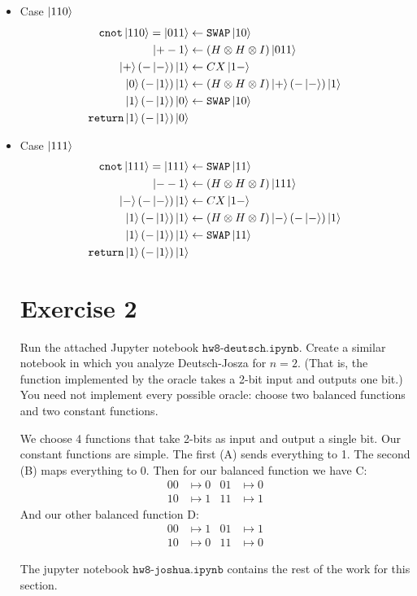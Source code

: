 \documentclass[11pt]{article}
\def\swap{\texttt{SWAP}}
\def\cnot{\texttt{cnot}}
\begin{document}
\begin{itemize}
\item[] Case $\ket{110}$
\begin{align*}
    \cnot\ket{110} = 
    \ket{011} &\leftarrow \swap\ket{10} \\
    \ket{+-1} &\leftarrow (H \otimes H \otimes I)\ket{011} \\
    \ket{+}(-\ket{-})\ket{1} &\leftarrow CX\ket{1-} \\
    \ket{0}(-\ket{1})\ket{1} &\leftarrow (H \otimes H \otimes I)\ket{+}(-\ket{-})\ket{1} \\
    \ket{1}(-\ket{1})\ket{0} &\leftarrow \swap\ket{10} \\
     \texttt{return} \ket{1}(-\ket{1})\ket{0}
\end{align*}


\item[] Case $\ket{111}$
\begin{align*}
    \cnot\ket{111} = 
    \ket{111} &\leftarrow \swap\ket{11} \\
    \ket{--1} &\leftarrow (H \otimes H \otimes I)\ket{111} \\
    \ket{-}(-\ket{-})\ket{1} &\leftarrow CX\ket{1-} \\
    \ket{1}(-\ket{1})\ket{1} &\leftarrow 
        (H \otimes H \otimes I)\ket{-}(-\ket{-})\ket{1} \\
    \ket{1}(-\ket{1})\ket{1} &\leftarrow \swap\ket{11} \\
     \texttt{return} \ket{1}(-\ket{1})\ket{1}
\end{align*}

\section*{Exercise 2}
Run the attached Jupyter notebook $\texttt{hw8-deutsch.ipynb}$. Create 
a similar notebook in which you analyze Deutsch-Josza for $n = 2$. 
(That is, the function implemented by the oracle takes a 2-bit 
input and outputs one bit.) You need not implement every possible oracle: choose two
balanced functions and two constant functions. 

We choose 4 functions that take 2-bits as input and output a single bit. 
Our constant functions are simple. The first (A) sends everything to 1. The second (B)
maps everything to 0. Then for our balanced function we have C: 
\begin{align*}
    00 &\mapsto 0 & 01 &\mapsto 0 \\
    10 &\mapsto 1 & 11 &\mapsto 1 
\end{align*}
And our other balanced function D:
\begin{align*}
    00 &\mapsto 1 & 01 &\mapsto 1 \\
    10 &\mapsto 0 & 11 &\mapsto 0 
\end{align*}

The jupyter notebook $\texttt{hw8-joshua.ipynb}$ contains the rest of the work for this section.


\end{itemize}

\end{document}
